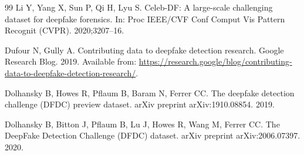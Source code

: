\begin{thebibliography}{99}
Li Y, Yang X, Sun P, Qi H, Lyu S.
Celeb-DF: A large-scale challenging dataset for deepfake forensics.
In: Proc IEEE/CVF Conf Comput Vis Pattern Recognit (CVPR). 2020;3207--16.

Dufour N, Gully A.
Contributing data to deepfake detection research.
Google Research Blog. 2019. Available from: \url{https://research.google/blog/contributing-data-to-deepfake-detection-research/}.

Dolhansky B, Howes R, Pflaum B, Baram N, Ferrer CC.
The deepfake detection challenge (DFDC) preview dataset.
arXiv preprint arXiv:1910.08854. 2019.

Dolhansky B, Bitton J, Pflaum B, Lu J, Howes R, Wang M, Ferrer CC.
The DeepFake Detection Challenge (DFDC) dataset.
arXiv preprint arXiv:2006.07397. 2020.

\end{thebibliography}
